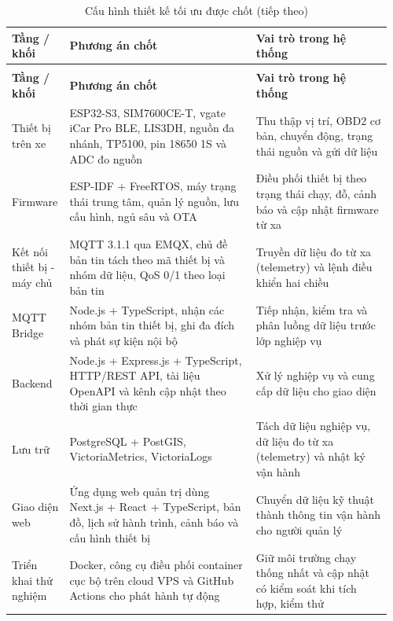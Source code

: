 \documentclass[a4paper]{extarticle}
\newcommand{\thesissettableid}[2]{%
  \renewcommand{\thetable}{#1}%
  \renewcommand{\theHtable}{#2}%
}
\begin{document}
{\thesissettableid{3.45}{condensed-bang-3-45-cau-hinh-thiet-ke-toi-uu-duoc-chot}
\def\LTcaptype{table}
\begin{longtable}{|L{0.118\linewidth}|L{0.488\linewidth}|L{0.353\linewidth}|}
\caption{Cấu hình thiết kế tối ưu được chốt}\label{tab:condensed-bang-3-45-cau-hinh-thiet-ke-toi-uu-duoc-chot}\\
\hline
\textbf{Tầng / khối} & \textbf{Phương án chốt} & \textbf{Vai trò trong hệ thống} \\
\hline
\endfirsthead
\caption[]{Cấu hình thiết kế tối ưu được chốt (tiếp theo)}\\
\hline
\textbf{Tầng / khối} & \textbf{Phương án chốt} & \textbf{Vai trò trong hệ thống} \\
\hline
\endhead
\endfoot
\endlastfoot
Thiết bị trên xe & ESP32-S3, SIM7600CE-T, vgate iCar Pro BLE, LIS3DH, nguồn đa nhánh, TP5100, pin 18650 1S và ADC đo nguồn & Thu thập vị trí, OBD2 cơ bản, chuyển động, trạng thái nguồn và gửi dữ liệu \\\hline
Firmware & ESP-IDF + FreeRTOS, máy trạng thái trung tâm, quản lý nguồn, lưu cấu hình, ngủ sâu và OTA & Điều phối thiết bị theo trạng thái chạy, đỗ, cảnh báo và cập nhật firmware từ xa \\\hline
Kết nối thiết bị - máy chủ & MQTT 3.1.1 qua EMQX, chủ đề bản tin tách theo mã thiết bị và nhóm dữ liệu, QoS 0/1 theo loại bản tin & Truyền dữ liệu đo từ xa (telemetry) và lệnh điều khiển hai chiều \\\hline
MQTT Bridge & Node.js + TypeScript, nhận các nhóm bản tin thiết bị, ghi đa đích và phát sự kiện nội bộ & Tiếp nhận, kiểm tra và phân luồng dữ liệu trước lớp nghiệp vụ \\\hline
Backend & Node.js + Express.js + TypeScript, HTTP/REST API, tài liệu OpenAPI và kênh cập nhật theo thời gian thực & Xử lý nghiệp vụ và cung cấp dữ liệu cho giao diện \\\hline
Lưu trữ & PostgreSQL + PostGIS, VictoriaMetrics, VictoriaLogs & Tách dữ liệu nghiệp vụ, dữ liệu đo từ xa (telemetry) và nhật ký vận hành \\\hline
Giao diện web & Ứng dụng web quản trị dùng Next.js + React + TypeScript, bản đồ, lịch sử hành trình, cảnh báo và cấu hình thiết bị & Chuyển dữ liệu kỹ thuật thành thông tin vận hành cho người quản lý \\\hline
Triển khai thử nghiệm & Docker, công cụ điều phối container cục bộ trên cloud VPS và GitHub Actions cho phát hành tự động & Giữ môi trường chạy thống nhất và cập nhật có kiểm soát khi tích hợp, kiểm thử \\\hline
\end{longtable}
}
\end{document}
